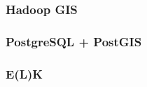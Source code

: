 \documentclass[hyperref={pdfpagelabels=true}]{beamer}
\begin{document}
\begin{frame}
\frametitle{Hadoop GIS}
\end{frame}

\begin{frame}
\frametitle{PostgreSQL + PostGIS}
\end{frame}

\begin{frame}
\frametitle{E(L)K}
\end{frame}
\end{document}
